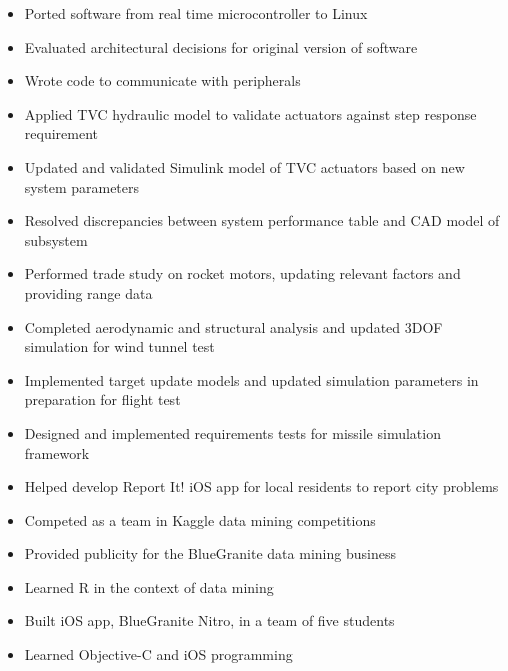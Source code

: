 \documentclass{resume}
\begin{document}
\begin{itemize}
    \item Ported software from real time microcontroller to Linux
    \item Evaluated architectural decisions for original version of software
    \item Wrote code to communicate with peripherals
\end{itemize}
\begin{itemize}
    \item Applied TVC hydraulic model to validate actuators against step response requirement
    \item Updated and validated Simulink model of TVC actuators based on new system parameters
    \item Resolved discrepancies between system performance table and CAD model of subsystem
\end{itemize}
\begin{itemize}
    \item Performed trade study on rocket motors, updating relevant factors and providing range data
    \item Completed aerodynamic and structural analysis and updated 3DOF simulation for wind tunnel test
    \item Implemented target update models and updated simulation parameters in preparation for flight test
    \item Designed and implemented requirements tests for missile simulation framework
\end{itemize}
\begin{itemize}
    \item Helped develop Report It! iOS app for local residents to report city problems
\end{itemize}
\begin{itemize}
    \item Competed as a team in Kaggle data mining competitions
    \item Provided publicity for the BlueGranite data mining business
    \item Learned R in the context of data mining
\end{itemize}
\begin{itemize}
    \item Built iOS app, BlueGranite Nitro, in a team of five students
    \item Learned Objective-C and iOS programming
\end{itemize}
\end{document}
